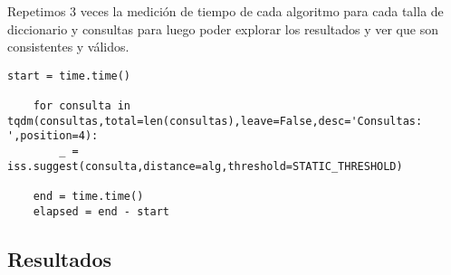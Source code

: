 Repetimos 3 veces la medición de tiempo de cada algoritmo para cada talla de diccionario y consultas para luego poder explorar los resultados y ver que son consistentes y válidos.
\begin{lstlisting}[caption=medición de tiempos]
    start = time.time()
                        
    for consulta in tqdm(consultas,total=len(consultas),leave=False,desc='Consultas: ',position=4):
        _ = iss.suggest(consulta,distance=alg,threshold=STATIC_THRESHOLD)

    end = time.time()
    elapsed = end - start
\end{lstlisting}

\subsection{Resultados}



\newpage 